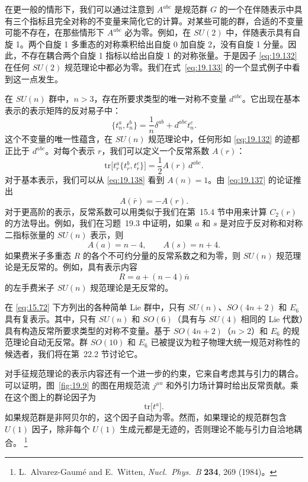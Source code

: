 在更一般的情形下，我们可以通过注意到 $A^{abc}$ 是规范群 $G$ 的一个在伴随表示中具有三个指标且完全对称的不变量来简化它的计算。对某些可能的群，合适的不变量可能不存在，在那些情形下 $A^{abc}$ 必为零。例如，在 $SU(2)$ 中，伴随表示具有自旋 1。两个自旋 1 多重态的对称乘积给出自旋 0 加自旋 2，没有自旋 1 分量。因此，不存在耦合两个自旋 1 指标以给出自旋 1 的对称张量。于是因子 \eqref{eq:19.132} 在任何 $SU(2)$ 规范理论中都必为零。我们在式~\eqref{eq:19.133} 的一个显式例子中看到这一点发生。

在 $SU(n)$ 群中，$n > 3$，存在所要求类型的唯一对称不变量 $d^{abc}$。它出现在基本表示的表示矩阵的反对易子中：
\begin{equation}
  \{ t^a_n, t^b_n \} = \frac{1}{n}\delta^{ab} + d^{abc}t^c_n .
  \label{eq:19.138}
\end{equation}
这个不变量的唯一性蕴含，在 $SU(n)$ 规范理论中，任何形如 \eqref{eq:19.132} 的迹都正比于 $d^{abc}$。对每个表示 $r$，我们可以定义一个反常系数 $A(r)$：
\begin{equation}
  \mathrm{tr}\bigl[ t^a_r\{t^b_r, t^c_r\} \bigr] = \frac{1}{2}A(r)\,d^{abc}
  .
  \label{eq:19.139}
\end{equation}
对于基本表示，我们可以从 \eqref{eq:19.138} 看到 $A(n) = 1$。由 \eqref{eq:19.137} 的论证推出
\begin{equation}
  A(\bar{r}) = -A(r) .
  \label{eq:19.140}
\end{equation}
对于更高阶的表示，反常系数可以用类似于我们在第~15.4 节中用来计算 $C_2(r)$ 的方法导出。例如，我们在习题~19.3 中证明，如果 $a$ 和 $s$ 是对应于反对称和对称二指标张量的 $SU(n)$ 表示，则
\begin{equation}
  A(a) = n - 4,\qquad A(s) = n + 4 .
  \label{eq:19.141}
\end{equation}
如果费米子多重态 $R$ 的各个不可约分量的反常系数之和为零，则 $SU(n)$ 规范理论是无反常的。例如，具有表示内容
\begin{equation}
  R = a + (n-4)\bar{n}
  \label{eq:19.142}
\end{equation}
的左手费米子 $SU(n)$ 规范理论是无反常的。

在 \eqref{eq:15.72} 下方列出的各种简单 Lie 群中，只有 $SU(n)$、$SO(4n+2)$ 和 $E_6$ 具有复表示。其中，只有 $SU(n)$ 和 $SO(6)$（具有与 $SU(4)$ 相同的 Lie 代数）具有构造反常所要求类型的对称不变量。基于 $SO(4n+2)$（$n > 2$）和 $E_6$ 的规范理论自动无反常。群 $SO(10)$ 和 $E_6$ 已被提议为粒子物理大统一规范对称性的候选者，我们将在第~22.2 节讨论它。

对手征规范理论的表示内容还有一个进一步的约束，它来自考虑其与引力的耦合。可以证明，图~\ref{fig:19.9} 的图在用规范流 $j^{\mu a}$ 和外引力场计算时给出反常贡献。乘在这个图上的群论因子为
\begin{equation}
  \mathrm{tr}\bigl[ t^a \bigr] .
  \label{eq:19.143}
\end{equation}
如果规范群是非阿贝尔的，这个因子自动为零。然而，如果理论的规范群包含 $U(1)$ 因子，除非每个 $U(1)$ 生成元都是无迹的，否则理论不能与引力自洽地耦合。%
\footnote{L.~Alvarez-Gaum\'e and E.~Witten, \emph{Nucl.\ Phys.\ B} \textbf{234},
269 (1984)。}

